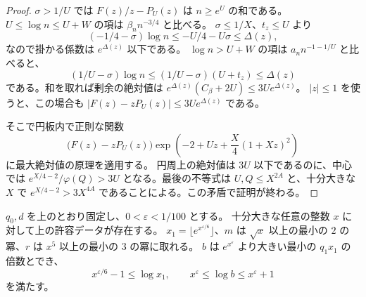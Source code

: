 \begin{proof}
\(\sigma>1/U\) では \(F(z)/z-P_U(z)\) は \(n\ge e^U\) の和である。
\(U\le\log n\le U+W\) の項は \(\beta_n n^{-3/4}\) と比べる。
\(\sigma\le1/X\)、\(t_z\le U\) より
\[
 (-1/4-\sigma)\log n\le -U/4-U\sigma\le\Delta(z),
\]
なので掛かる係数は \(e^{\Delta(z)}\) 以下である。
\(\log n>U+W\) の項は \(a_n n^{-1-1/U}\) と比べると、
\[
 (1/U-\sigma)\log n
   \le(1/U-\sigma)(U+t_z)\le\Delta(z)
\]
である。和を取れば剰余の絶対値は
\(e^{\Delta(z)}(C_\beta+2U)\le3Ue^{\Delta(z)}\)。
\(|z|\le1\) を使うと、この場合も
\(|F(z)-zP_U(z)|\le3Ue^{\Delta(z)}\) である。

そこで円板内で正則な関数
\[
 \bigl(F(z)-zP_U(z)\bigr)\exp\!\left(-2+Uz+\frac X4(1+Xz)^2\right)
\]
に最大絶対値の原理を適用する。
円周上の絶対値は \(3U\) 以下であるのに、中心では
\(e^{X/4-2}/\varphi(Q)>3U\) となる。最後の不等式は
\(U,Q\le X^{2A}\) と、十分大きな \(X\) で
\(e^{X/4-2}>3X^{4A}\) であることによる。この矛盾で証明が終わる。
\end{proof}

\begin{proposition}\label{prop:admissible-data}
\(q_0,d\) を上のとおり固定し、\(0<\varepsilon<1/100\) とする。
十分大きな任意の整数 \(x\) に対して上の許容データが存在する。
\(x_1=\lfloor e^{x^{\varepsilon/6}}\rfloor\)、\(m\) は \(\sqrt{x}\) 以上の最小の
\(2\) の冪、\(r\) は \(x^5\) 以上の最小の \(3\) の冪に取れる。
\(b\) は \(e^{x^\varepsilon}\) より大きい最小の \(q_1x_1\) の倍数とでき、
\[
 x^{\varepsilon/6}-1\le\log x_1,\qquad
 x^\varepsilon\le\log b\le x^\varepsilon+1
\]
を満たす。
\end{proposition}

